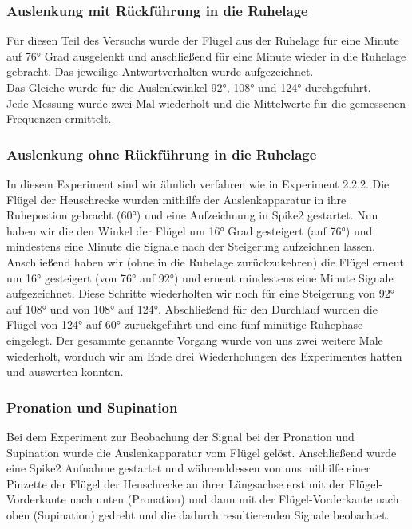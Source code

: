 \documentclass[a4paper]{article}
\begin{document}
\subsubsection{Auslenkung mit Rückführung in die Ruhelage}
Für diesen Teil des Versuchs wurde der Flügel aus der Ruhelage für eine Minute auf \ang{76} Grad ausgelenkt und anschließend für eine Minute wieder in die Ruhelage gebracht. Das jeweilige Antwortverhalten wurde aufgezeichnet.\\
Das Gleiche wurde für die Auslenkwinkel \ang{92}, \ang{108} und \ang{124} durchgeführt.\\
Jede Messung wurde zwei Mal wiederholt und die Mittelwerte für die gemessenen Frequenzen ermittelt.

\subsubsection{Auslenkung ohne Rückführung in die Ruhelage}

In diesem Experiment sind wir ähnlich verfahren wie in Experiment 2.2.2. Die Flügel der Heuschrecke wurden mithilfe der Auslenkapparatur in ihre Ruhepostion gebracht (\ang{60}) und eine Aufzeichnung in Spike2 gestartet. Nun haben wir die den Winkel der Flügel um \ang{16} Grad gesteigert (auf \ang{76}) und mindestens eine Minute die Signale nach der Steigerung aufzeichnen lassen. Anschließend haben wir (ohne in die Ruhelage zurückzukehren) die Flügel erneut um \ang{16} gesteigert (von \ang{76} auf \ang{92}) und erneut mindestens eine Minute Signale aufgezeichnet. Diese Schritte wiederholten wir noch für eine Steigerung von \ang{92} auf \ang{108} und von \ang{108} auf \ang{124}. Abschließend für den Durchlauf wurden die Flügel von \ang{124} auf \ang{60} zurückgeführt und eine fünf minütige Ruhephase eingelegt. Der gesammte genannte Vorgang wurde von uns zwei weitere Male wiederholt, worduch wir am Ende drei Wiederholungen des Experimentes hatten und auswerten konnten. 

\subsubsection{Pronation und Supination}

Bei dem Experiment zur Beobachung der Signal bei der Pronation und Supination wurde die Auslenkapparatur vom Flügel gelöst. Anschließend wurde eine Spike2 Aufnahme gestartet und währenddessen von uns mithilfe einer Pinzette der Flügel der Heuschrecke an ihrer Längsachse erst mit der Flügel-Vorderkante nach unten (Pronation) und dann mit der Flügel-Vorderkante nach oben (Supination) gedreht und die dadurch resultierenden Signale beobachtet.
\end{document}
